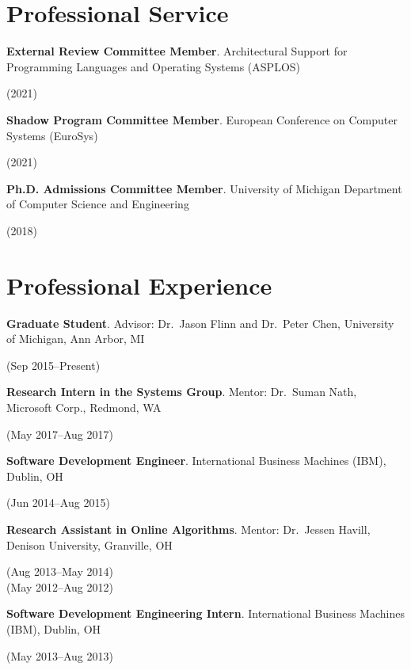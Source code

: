 \documentclass[letterpaper,10pt]{article}
\newcommand{\sidebyside}[2]{
  \begin{minipage}[t]{.75\textwidth}
    \raggedright{}
    #2
  \end{minipage}
  \hspace{.01\textwidth}
    \begin{minipage}[t]{.205\textwidth}
    \raggedleft
    #1
  \end{minipage}
}
\newcommand{\trio}[3]{\sidebyside{#3}{\textbf{#1}. #2}}
\begin{document}
\section{Professional Service}
\begin{smenumerate}
\item\trio{External Review Committee Member}{Architectural Support for
  Programming Languages and Operating Systems (ASPLOS)}{(2021)}

\item\trio{Shadow Program Committee Member}{European Conference on Computer
  Systems (EuroSys)}{(2021)}

\item\trio{Ph.D. Admissions Committee Member}{University of Michigan Department
  of Computer Science and Engineering}{(2018)}
\end{smenumerate}


\section{Professional Experience}
\begin{smenumerate}
\item\trio{Graduate Student}{Advisor: Dr.\ Jason Flinn and Dr.\ Peter Chen,
  University of Michigan, Ann Arbor, MI}{(Sep 2015--Present)}

\item\trio{Research Intern in the Systems Group}{Mentor: Dr.\ Suman Nath,
  Microsoft Corp., Redmond, WA}{(May 2017--Aug 2017)}

\item\trio{Software Development Engineer}{International Business Machines (IBM),
  Dublin, OH}{(Jun 2014--Aug 2015)}

\item\trio{Research Assistant in Online Algorithms}{Mentor: Dr.\ Jessen Havill,
  Denison University, Granville, OH}{(Aug 2013--May 2014)\\(May 2012--Aug 2012)}

\item\trio{Software Development Engineering Intern}{International Business
  Machines (IBM), Dublin, OH}{(May 2013--Aug 2013)}

\end{smenumerate}
\end{document}
